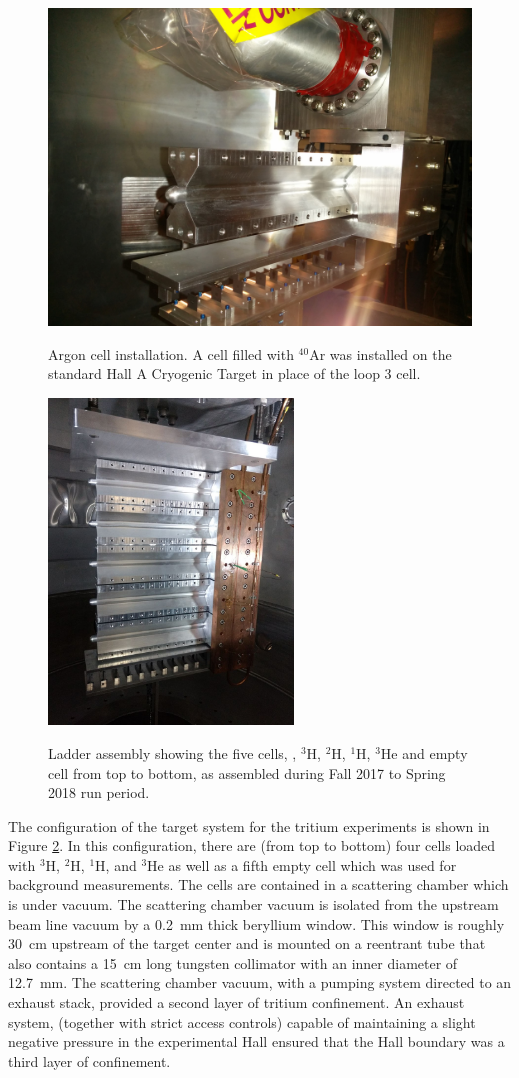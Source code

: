 \documentclass[final,5p,times,twocolumn]{elsarticle}
\begin{document}
\begin{figure}[htbp]
	\centering
	\includegraphics[width=6.5 cm]{images/Ar-cell.jpg}\\
	\caption{Argon cell installation. A cell filled with $^{40}$Ar was installed on the standard Hall A Cryogenic Target in place of the loop 3 cell.}
	\label{argon}
\end{figure}

\begin{figure}[htbp]
  \centering
  \includegraphics[width=6.5cm]{images/ladder.jpg}\\
  \caption{Ladder assembly showing the five cells, , $^{3}$H, $^{2}$H, $^{1}$H, $^{3}$He and empty cell from top to bottom, 
           as assembled during Fall 2017 to Spring 2018 run period.}
  \label{ladder}
\end{figure}

The configuration of the target system for the tritium experiments is shown in Figure \ref{ladder}. In this configuration, there are (from top to bottom) 
four cells loaded with $^{3}$H, $^{2}$H, $^{1}$H, and $^{3}$He as well as a fifth empty cell which was used for background 
measurements. The cells are contained in a scattering chamber which is under vacuum. The scattering chamber vacuum is isolated 
from the upstream beam line vacuum by a 0.2~mm thick beryllium window. This window is roughly 30~cm upstream of the target center 
and is mounted on a reentrant tube that also contains a 15~cm long tungsten collimator with an inner diameter of 12.7~mm. 
The scattering chamber vacuum, with a pumping system directed to an exhaust stack, provided a second layer of tritium confinement. An 
exhaust system, (together with strict access controls) capable of maintaining a slight negative pressure in the experimental 
Hall ensured that the Hall boundary was a third layer of confinement.
\end{document}
